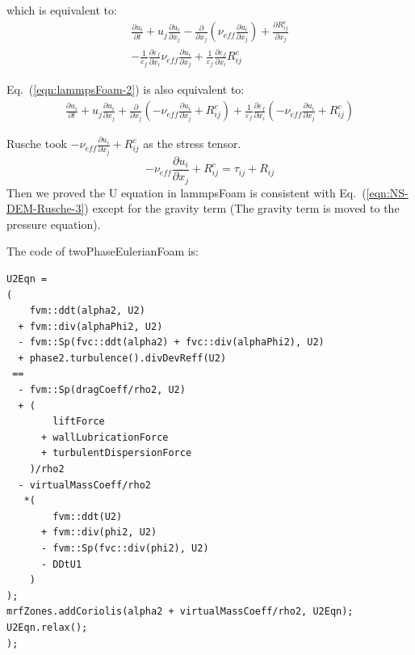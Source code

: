 \documentclass[11pt]{article}
\begin{document}
which is equivalent to:
\begin{equation}
    \begin{split}
      \frac{\partial u_i}{\partial t}
      + u_j \frac{\partial u_i}{\partial x_j}
      - \frac{\partial}{\partial x_j}\left(\nu_{eff} \frac{\partial u_i}{\partial x_j}\right)
      + \frac{\partial R^c_{ij}}{\partial x_j}\\ 
      - \frac{1}{\varepsilon_f}\frac{\partial \varepsilon_f}{\partial x_i}
        \nu_{eff}\frac{\partial u_i}{\partial x_j}
      + \frac{1}{\varepsilon_f}\frac{\partial \varepsilon_f}{\partial x_i}R^c_{ij}
    \end{split}
\label{eqn:lammpsFoam-2}
\end{equation}

Eq.~(\ref{eqn:lammpsFoam-2}) is also equivalent to:
\begin{equation}
    \begin{split}
      \frac{\partial u_i}{\partial t}
      + u_j \frac{\partial u_i}{\partial x_j}
      + \frac{\partial}{\partial x_j}\left(-\nu_{eff} \frac{\partial u_i}{\partial x_j} +
      R^c_{ij}\right)
      + \frac{1}{\varepsilon_f}\frac{\partial \varepsilon_f}{\partial x_i}
        \left(-\nu_{eff}\frac{\partial u_i}{\partial x_j}+R^c_{ij}\right)
    \end{split}
\label{eqn:lammpsFoam-3}
\end{equation}

Rusche took $-\nu_{eff}\frac{\partial u_i}{\partial x_j}+R^c_{ij}$ as the stress tensor.
\begin{equation}
      -\nu_{eff}\frac{\partial u_i}{\partial x_j}+R^c_{ij}
      = \tau_{ij} + R_{ij}
\label{eqn:lammpsFoam-tensor}
\end{equation}
Then we proved the U equation in lammpsFoam is consistent with Eq.~(\ref{eqn:NS-DEM-Rusche-3})
except for the gravity term (The gravity term is moved to the pressure equation).

The code of twoPhaseEulerianFoam is:
\begin{lstlisting}[basicstyle=\ttfamily\scriptsize]
U2Eqn =
(
    fvm::ddt(alpha2, U2)
  + fvm::div(alphaPhi2, U2)
  - fvm::Sp(fvc::ddt(alpha2) + fvc::div(alphaPhi2), U2)
  + phase2.turbulence().divDevReff(U2)
 ==
  - fvm::Sp(dragCoeff/rho2, U2)
  + (
        liftForce
      + wallLubricationForce
      + turbulentDispersionForce
    )/rho2
  - virtualMassCoeff/rho2
   *(
        fvm::ddt(U2)
      + fvm::div(phi2, U2)
      - fvm::Sp(fvc::div(phi2), U2)
      - DDtU1
    )
);
mrfZones.addCoriolis(alpha2 + virtualMassCoeff/rho2, U2Eqn);
U2Eqn.relax();
);
\end{lstlisting}
\end{document}

